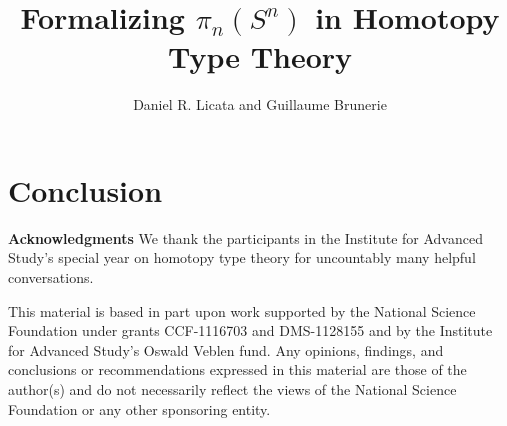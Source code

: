 \documentclass{drl-common/llncs}
\begin{document}
\title{Formalizing $\pi_n(S^n)$ in Homotopy Type Theory}

\author{Daniel R. Licata
        and Guillaume Brunerie}



\maketitle



\section{Conclusion}

\textbf{Acknowledgments} We thank the participants in the 
Institute for Advanced Study's special year on homotopy type theory
for uncountably many helpful conversations.  

This material is based in part upon work supported by the National
Science Foundation under grants CCF-1116703 and DMS-1128155 and by the
Institute for Advanced Study's Oswald Veblen fund.  Any opinions,
findings, and conclusions or recommendations expressed in this material
are those of the author(s) and do not necessarily reflect the views of
the National Science Foundation or any other sponsoring entity.

{ \small


}
\end{document}
